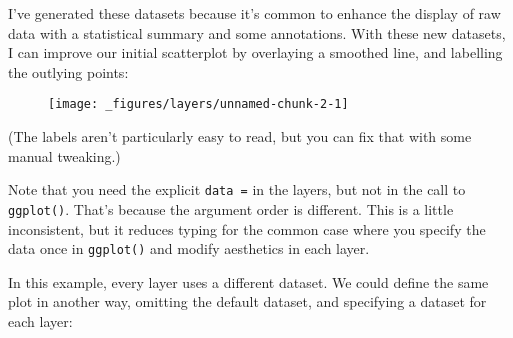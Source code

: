 I've generated these datasets because it's common to enhance the display
of raw data with a statistical summary and some annotations. With these
new datasets, I can improve our initial scatterplot by overlaying a
smoothed line, and labelling the outlying points:

\begin{Shaded}
\begin{Highlighting}[]
\StringTok{ }
\StringTok{  }\NormalTok{() +}\StringTok{ }
\StringTok{  }\NormalTok{(}  \NormalTok{, } \NormalTok{) +}\StringTok{ }
\StringTok{  }\NormalTok{(} \NormalTok{(} 
\end{Highlighting}
\end{Shaded}

\begin{figure}[H]
  \centering
  \texttt{[image: \_figures/layers/unnamed-chunk-2-1]}
\end{figure}

(The labels aren't particularly easy to read, but you can fix that with
some manual tweaking.)

Note that you need the explicit \texttt{data\ =} in the layers, but not
in the call to \texttt{ggplot()}. That's because the argument order is
different. This is a little inconsistent, but it reduces typing for the
common case where you specify the data once in \texttt{ggplot()} and
modify aesthetics in each layer.

In this example, every layer uses a different dataset. We could define
the same plot in another way, omitting the default dataset, and
specifying a dataset for each layer:

\begin{Shaded}
\begin{Highlighting}[]
\NormalTok{(} \StringTok{ }
\StringTok{  }\NormalTok{(} \StringTok{ }
\StringTok{  }\NormalTok{(} \StringTok{ }
\StringTok{  }\NormalTok{(} \NormalTok{(} 
\end{Highlighting}
\end{Shaded}

